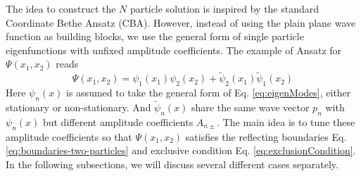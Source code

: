 \documentclass[12pt,a4paper]{article}
\begin{document}
The idea to construct the $N$ particle solution is inspired by the standard
Coordinate Bethe Ansatz (CBA). However, instead of using the plain plane wave
function as building blocks, we use the general form of single particle
eigenfunctions with unfixed amplitude coefficients.
The example of Ansatz for $\Psi(x_1, x_2)$ reads
\begin{equation}
    \label{eq:ansatzTwo}
    \Psi(x_1, x_2) = \psi_1(x_1)\psi_2(x_2) + \tilde{\psi}_2(x_1)\tilde{\psi}_1(x_2)
\end{equation}
Here $\psi_n(x)$ is assumed to take the general form of Eq.
\eqref{eq:eigenModes}, either stationary or non-stationary. And
$\tilde{\psi}_n(x)$ share the same wave vector $p_n$ with $\psi_n(x)$ but
different amplitude coefficients $A_{n\pm}$. The main idea is to tune these
amplitude coefficients so that $\Psi(x_1, x_2)$ satisfies the reflecting
boundaries Eq. \eqref{eq:boundaries-two-particles} and exclusive condition Eq.
\eqref{eq:exclusionCondition}.  
In the following subsections, we will discuss several different cases
separately.  
\end{document}
